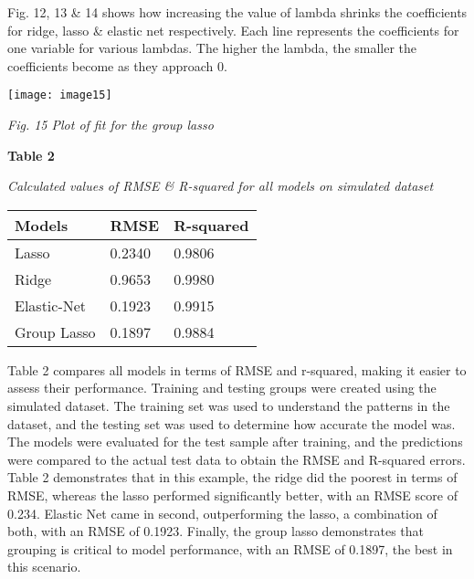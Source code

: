 \documentclass{article} %
\begin{document}
\noindent \textbf{}

\noindent 

\noindent Fig. 12, 13 \& 14 shows how increasing the value of lambda shrinks the coefficients for ridge, lasso \& elastic net respectively. Each line represents the coefficients for one variable for various lambdas. The higher the lambda, the smaller the coefficients become as they approach 0.

\noindent 

\noindent \texttt{[image: image15]}

\noindent \textit{Fig. 15 Plot of fit for the group lasso}

\noindent \textit{}

\noindent \textbf{Table 2}

\noindent \textit{Calculated values of RMSE \& R-squared for all models on simulated dataset}

\begin{tabular}{|p{1.3in}|p{1.3in}|p{1.3in}|} \hline 
\textbf{Models} & \textbf{RMSE} & \textbf{R-squared} \\ \hline 
Lasso & 0.2340 & 0.9806 \\ \hline 
Ridge & 0.9653 & 0.9980 \\ \hline 
Elastic-Net & 0.1923 & 0.9915 \\ \hline 
Group Lasso & 0.1897 & 0.9884 \\ \hline 
\end{tabular}



\noindent Table 2 compares all models in terms of RMSE and r-squared, making it easier to assess their performance. Training and testing groups were created using the simulated dataset. The training set was used to understand the patterns in the dataset, and the testing set was used to determine how accurate the model was. The models were evaluated for the test sample after training, and the predictions were compared to the actual test data to obtain the RMSE and R-squared errors. Table 2 demonstrates that in this example, the ridge did the poorest in terms of RMSE, whereas the lasso performed significantly better, with an RMSE score of 0.234. Elastic Net came in second, outperforming the lasso, a combination of both, with an RMSE of 0.1923. Finally, the group lasso demonstrates that grouping is critical to model performance, with an RMSE of 0.1897, the best in this scenario. 

\noindent \textbf{}
\end{document}
